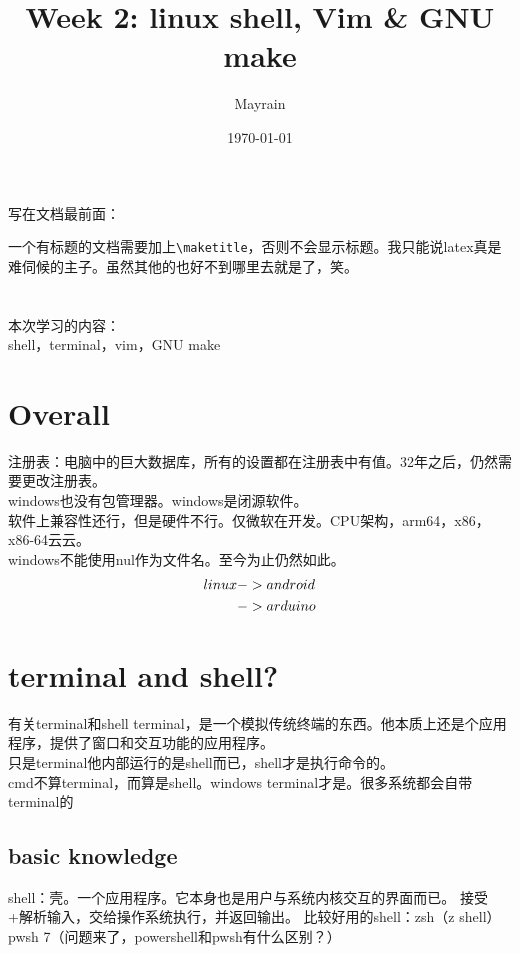 \documentclass{article}
\title{Week 2: linux shell, Vim \& GNU make}
\author{Mayrain}
\date{\today}
\begin{document}
\maketitle

\begin{center}
    写在文档最前面：
\end{center}
一个有标题的文档需要加上\verb|\maketitle|，否则不会显示标题。我只能说latex真是难伺候的主子。虽然其他的也好不到哪里去就是了，笑。\\
\\
\\
\noindent
本次学习的内容：\\
shell，terminal，vim，GNU make\\

\section{Overall}
\noindent
注册表：电脑中的巨大数据库，所有的设置都在注册表中有值。32年之后，仍然需要更改注册表。\\
windows也没有包管理器。windows是闭源软件。\\
软件上兼容性还行，但是硬件不行。仅微软在开发。CPU架构，arm64，x86，x86-64云云。\\
windows不能使用nul作为文件名。至今为止仍然如此。\\
\begin{align}
    linux & ->android \notag   \\
          & ->arduino   \notag
\end{align}

\section{terminal and shell?}
\noindent
有关terminal和shell
terminal，是一个模拟传统终端的东西。他本质上还是个应用程序，提供了窗口和交互功能的应用程序。\\
只是terminal他内部运行的是shell而已，shell才是执行命令的。\\
cmd不算terminal，而算是shell。windows terminal才是。很多系统都会自带terminal的

\subsection{basic knowledge}
\noindent
shell：壳。一个应用程序。它本身也是用户与系统内核交互的界面而已。
接受+解析输入，交给操作系统执行，并返回输出。
比较好用的shell：zsh（z shell）
pwsh 7（问题来了，powershell和pwsh有什么区别？）
\end{document}
